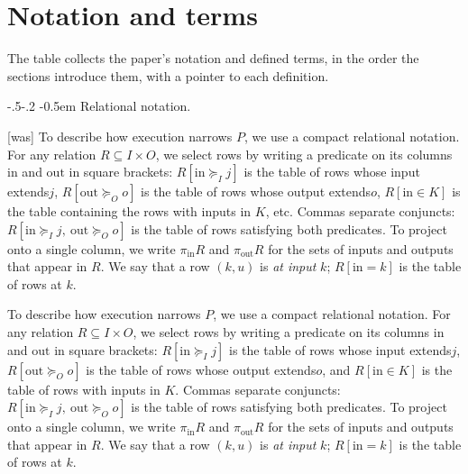 \documentclass[sigconf]{cidr-2027}
\makeatletter
\theoremstyle{remark}
\renewcommand\paragraph{\@startsection{paragraph}{4}{\z@}%
  {-.5\baselineskip \@plus -2\p@ \@minus -.2\p@}%
  {-0.5em}%
  {\normalfont\bfseries}}
\newcommand{\InputGe}{\succeq_I}
\newcommand{\OutputGe}{\succeq_O}
\newcommand{\inrel}{extends\xspace}          %
\newcommand{\outrel}{extends\xspace}          %
\makeatother
\begin{document}
\appendix
\section{Notation and terms}
\label{app:notation}

The table collects the paper's notation and defined terms, in the order the
sections introduce them, with a pointer to each definition.

\paragraph{Relational notation.}


{\footnotesize\color{black!50}\noindent\textsf{[was]} To describe how execution narrows $P$, we use a compact relational notation.
For any relation
$R\subseteq I\times O$, we select rows by writing a predicate on its
columns $\mathrm{in}$ and $\mathrm{out}$ in square brackets: $R[\mathrm{in}\InputGe j]$ is the table of rows
whose input \inrel $j$, $R[\mathrm{out}\OutputGe o]$ is the table of rows
whose output \outrel $o$, $R[\mathrm{in}\in K]$ is
the table containing the rows with inputs in $K$, etc.  Commas separate conjuncts:
$R[\mathrm{in}\InputGe j,\ \mathrm{out}\OutputGe o]$ is the table of rows
satisfying both predicates.
To project onto a single column, we write $\pi_{\mathrm{in}}R$ and
$\pi_{\mathrm{out}}R$ for the sets of inputs and outputs that appear in $R$.
We say that a row $(k,u)$ is \emph{at input} $k$; $R[\mathrm{in}=k]$ is the table of
rows at $k$.\par}

\color{blue!70!black}To describe how execution narrows $P$, we use a compact relational notation.
For any relation
$R\subseteq I\times O$, we select rows by writing a predicate on its
columns $\mathrm{in}$ and $\mathrm{out}$ in square brackets: $R[\mathrm{in}\InputGe j]$ is the table of rows
whose input \inrel $j$, $R[\mathrm{out}\OutputGe o]$ is the table of rows
whose output \outrel $o$, and $R[\mathrm{in}\in K]$ is
the table of rows with inputs in $K$.  Commas separate conjuncts:
$R[\mathrm{in}\InputGe j,\ \mathrm{out}\OutputGe o]$ is the table of rows
satisfying both predicates.
To project onto a single column, we write $\pi_{\mathrm{in}}R$ and
$\pi_{\mathrm{out}}R$ for the sets of inputs and outputs that appear in $R$.
We say that a row $(k,u)$ is \emph{at input} $k$; $R[\mathrm{in}=k]$ is the table of
rows at $k$.\color{black}
\end{document}
